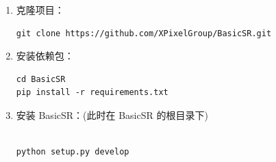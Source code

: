 \documentclass[../main.tex]{subfiles}
\begin{document}
\begin{enumerate}
    \item 克隆项目：
    \begin{verbatim}
git clone https://github.com/XPixelGroup/BasicSR.git
    \end{verbatim}

    \item 安装依赖包：
    \begin{verbatim}
cd BasicSR
pip install -r requirements.txt
    \end{verbatim}

    \item 安装 BasicSR：(此时在 BasicSR 的根目录下)

    \begin{verbatim}

python setup.py develop

    \end{verbatim}










\end{enumerate}

\label{section:clone}
\end{document}

